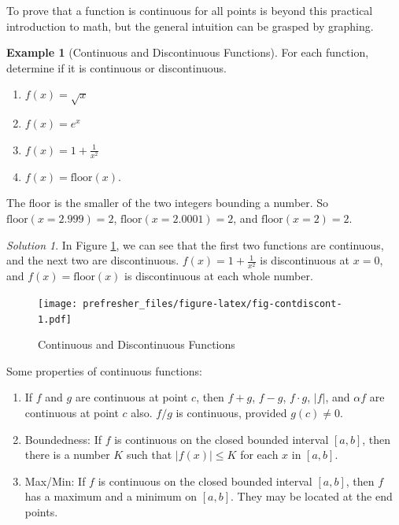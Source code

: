 \documentclass[
]{book}
\providecommand{\tightlist}{%
  \setlength{\itemsep}{0pt}\setlength{\parskip}{0pt}}
\theoremstyle{definition}
\theoremstyle{definition}
\newtheorem{example}{Example}[chapter]
\theoremstyle{definition}
\theoremstyle{remark}
\newtheorem*{solution}{Solution}
\begin{document}
To prove that a function is continuous for all points is beyond this practical introduction to math, but the general intuition can be grasped by graphing.

\begin{example}[Continuous and Discontinuous Functions]
\protect\hypertarget{exm:contdiscont}{}{\label{exm:contdiscont} {} }
For each function, determine if it is continuous or discontinuous.

\begin{enumerate}
\def\labelenumi{\arabic{enumi}.}
\tightlist
\item
  \(f(x) = \sqrt{x}\)
\item
  \(f(x) = e^x\)
\item
  \(f(x) = 1 + \frac{1}{x^2}\)
\item
  \(f(x) = \text{floor}(x)\).
\end{enumerate}

The floor is the smaller of the two integers bounding a number. So \(\text{floor}(x = 2.999) = 2\), \(\text{floor}(x = 2.0001) = 2\), and \(\text{floor}(x = 2) = 2.\)
\end{example}

\begin{solution}
{}In Figure \ref{fig:fig-contdiscont}, we can see that the first two functions are continuous, and the next two are discontinuous. \(f(x) = 1 + \frac{1}{x^2}\) is discontinuous at \(x= 0\), and \(f(x) = \text{floor}(x)\) is discontinuous at each whole number.
\end{solution}

\begin{figure}
\centering
\texttt{[image: prefresher\_files/figure-latex/fig-contdiscont-1.pdf]}
\caption{\label{fig:fig-contdiscont}Continuous and Discontinuous Functions}
\end{figure}

Some properties of continuous functions:

\begin{enumerate}
\def\labelenumi{\arabic{enumi}.}
\tightlist
\item
  If \(f\) and \(g\) are continuous at point \(c\), then \(f+g\), \(f-g\), \(f \cdot g\), \(|f|\), and \(\alpha f\) are continuous at point \(c\) also. \(f/g\) is continuous, provided \(g(c)\ne 0\).
\item
  Boundedness: If \(f\) is continuous on the closed bounded interval \([a,b]\), then there is a number \(K\) such that \(|f(x)|\le K\) for each \(x\) in \([a,b]\).
\item
  Max/Min: If \(f\) is continuous on the closed bounded interval \([a,b]\), then \(f\) has a maximum and a minimum on \([a,b]\). They may be located at the end points.
\end{enumerate}
\end{document}
